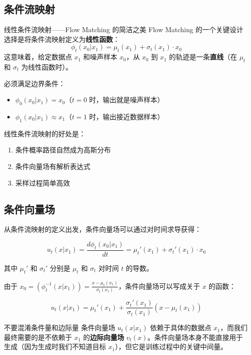 \subsection{条件流映射}

\begin{importantbox}{线性条件流映射——Flow Matching 的简洁之美}
Flow Matching 的一个关键设计选择是将条件流映射定义为\textbf{线性函数}：
$$\phi_t(x_0 | x_1) = \mu_t(x_1) + \sigma_t(x_1) \cdot x_0$$
这意味着，给定数据点 $x_1$ 和噪声样本 $x_0$，从 $x_0$ 到 $x_1$ 的轨迹是一条\textbf{直线}（在 $\mu_t$ 和 $\sigma_t$ 为线性函数时）。

必须满足边界条件：
\begin{itemize}
    \item $\phi_0(x_0 | x_1) = x_0$（$t=0$ 时，输出就是噪声样本）
    \item $\phi_1(x_0 | x_1) \approx x_1$（$t=1$ 时，输出接近数据样本）
\end{itemize}
\end{importantbox}

线性条件流映射的好处是：
\begin{enumerate}
    \item 条件概率路径自然成为高斯分布
    \item 条件向量场有解析表达式
    \item 采样过程简单高效
\end{enumerate}

\subsection{条件向量场}

从条件流映射的定义出发，条件向量场可以通过对时间求导获得：

$$u_t(x | x_1) = \frac{d\phi_t(x_0 | x_1)}{dt} = \mu_t'(x_1) + \sigma_t'(x_1) \cdot x_0$$

其中 $\mu_t'$ 和 $\sigma_t'$ 分别是 $\mu_t$ 和 $\sigma_t$ 对时间 $t$ 的导数。

由于 $x_0 = (\phi_t^{-1}(x | x_1)) = \frac{x - \mu_t(x_1)}{\sigma_t(x_1)}$，条件向量场可以写成关于 $x$ 的函数：

$$u_t(x | x_1) = \mu_t'(x_1) + \frac{\sigma_t'(x_1)}{\sigma_t(x_1)} \left( x - \mu_t(x_1) \right)$$

\begin{warningbox}{不要混淆条件量和边际量}
条件向量场 $u_t(x | x_1)$ 依赖于具体的数据点 $x_1$，而我们最终需要的是不依赖于 $x_1$ 的\textbf{边际向量场} $v_t(x)$。条件向量场本身不能直接用于生成（因为生成时我们不知道目标 $x_1$），但它是训练过程中的关键中间量。
\end{warningbox}

